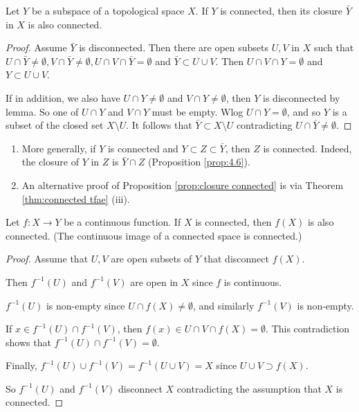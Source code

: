 \documentclass[a4paper,11pt]{article}
\begin{document}
\begin{proposition}\label{prop:closure connected}
    Let $Y$ be a subspace of a topological space $X$. If $Y$ is connected, then its closure $\bar{Y}$ in $X$ is also connected.
\end{proposition}
\begin{proof}
    Assume $\bar{Y}$ is disconnected. Then there are open subsets $U, V$ in $X$ such that $U \cap \bar{Y} \neq \emptyset, V \cap \bar{Y} \neq \emptyset, U \cap V \cap \bar{Y}=\emptyset$ and $\bar{Y} \subset U \cup V$. Then $U \cap V \cap Y=\emptyset$ and $Y \subset U \cup V$.

    If in addition, we also have $U \cap Y \neq \emptyset$ and $V \cap Y \neq \emptyset$, then $Y$ is disconnected by lemma. So one of $U \cap Y$ and $V \cap Y$ must be empty. Wlog $U \cap Y=\emptyset$, and so $Y$ is a subset of the closed set $X \setminus U$. It follows that $\bar{Y} \subset X \setminus U$ contradicting $U \cap \bar{Y} \neq \emptyset$.
\end{proof}

\begin{remark}
    \begin{enumerate}
        \item More generally, if $Y$ is connected and $Y \subset Z \subset \bar{Y}$, then $Z$ is connected. Indeed, the closure of $Y$ in $Z$ is $\bar{Y} \cap Z$ (Proposition \ref{prop:4.6}).
      
        \item An alternative proof of Proposition \ref{prop:closure connected} is via Theorem \ref{thm:connected tfae} (iii).
      
      \end{enumerate}
\end{remark}

\begin{theorem}\label{thm:continuous image connected}
    Let $f: X \rightarrow Y$ be a continuous function. If $X$ is connected, then $f(X)$ is also connected. (The continuous image of a connected space is connected.)
\end{theorem}

\begin{proof}
    Assume that $U, V$ are open subsets of $Y$ that disconnect $f(X)$.

    Then $f^{-1}(U)$ and $f^{-1}(V)$ are open in $X$ since $f$ is continuous.

    $f^{-1}(U)$ is non-empty since $U \cap f(X) \neq \emptyset$, and similarly $f^{-1}(V)$ is non-empty.

    If $x \in f^{-1}(U) \cap f^{-1}(V)$, then $f(x) \in U \cap V \cap f(X)=\emptyset$. This contradiction shows that $f^{-1}(U) \cap f^{-1}(V)=\emptyset$.

    Finally, $f^{-1}(U) \cup f^{-1}(V)=f^{-1}(U \cup V)=X$ since $U \cup V \supset f(X)$.

    So $f^{-1}(U)$ and $f^{-1}(V)$ disconnect $X$ contradicting the assumption that $X$ is connected.
\end{proof}
\end{document}
